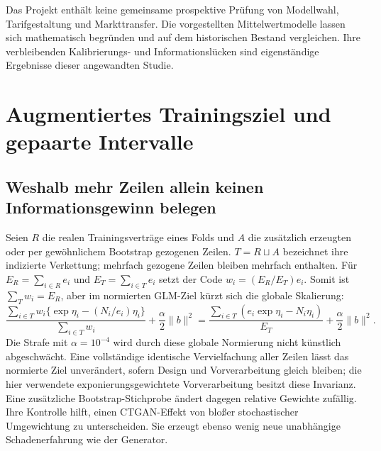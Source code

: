 \documentclass[11pt,a4paper]{article}
\begin{document}
Das Projekt enthält keine gemeinsame prospektive Prüfung von Modellwahl, Tarifgestaltung und Markttransfer. Die vorgestellten Mittelwertmodelle lassen sich mathematisch begründen und auf dem historischen Bestand vergleichen. Ihre verbleibenden Kalibrierungs- und Informationslücken sind eigenständige Ergebnisse dieser angewandten Studie.

\clearpage
\section{Augmentiertes Trainingsziel und gepaarte Intervalle}\label{app:augmentation}
\subsection*{Weshalb mehr Zeilen allein keinen Informationsgewinn belegen}
Seien $R$ die realen Trainingsverträge eines Folds und $A$ die zusätzlich erzeugten oder per gewöhnlichem Bootstrap gezogenen Zeilen. $T=R\sqcup A$ bezeichnet ihre indizierte Verkettung; mehrfach gezogene Zeilen bleiben mehrfach enthalten. Für $E_R=\sum_{i\in R}e_i$ und $E_T=\sum_{i\in T}e_i$ setzt der Code $w_i=(E_R/E_T)e_i$. Somit ist $\sum_Tw_i=E_R$, aber im normierten GLM-Ziel kürzt sich die globale Skalierung:
\begin{equation}
 \frac{\sum_{i\in T}w_i\{\exp\eta_i-(N_i/e_i)\eta_i\}}{\sum_{i\in T}w_i}
 +\frac{\alpha}{2}\|b\|^2
 =\frac{\sum_{i\in T}(e_i\exp\eta_i-N_i\eta_i)}{E_T}
 +\frac{\alpha}{2}\|b\|^2.
\end{equation}
Die Strafe mit $\alpha=10^{-4}$ wird durch diese globale Normierung nicht künstlich abgeschwächt. Eine vollständige identische Vervielfachung aller Zeilen lässt das normierte Ziel unverändert, sofern Design und Vorverarbeitung gleich bleiben; die hier verwendete exponierungsgewichtete Vorverarbeitung besitzt diese Invarianz. Eine zusätzliche Bootstrap-Stichprobe ändert dagegen relative Gewichte zufällig. Ihre Kontrolle hilft, einen CTGAN-Effekt von bloßer stochastischer Umgewichtung zu unterscheiden. Sie erzeugt ebenso wenig neue unabhängige Schadenerfahrung wie der Generator.
\end{document}
